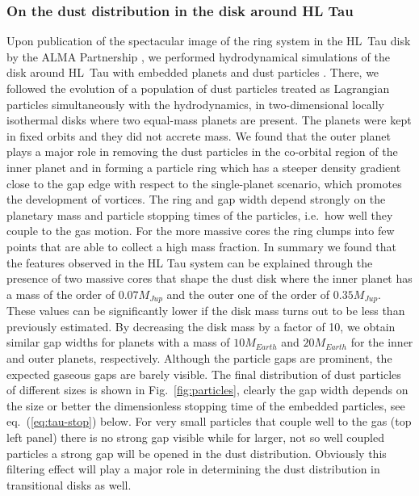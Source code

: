 \documentclass[10pt,fleqn,twoside]{article}
\begin{document}
\subsubsection{On the dust distribution in the disk around HL Tau}
%
Upon publication of the spectacular image of the ring system in the HL~Tau disk by the ALMA Partnership
\citep{2015ApJ...808L...3A}, we
performed hydrodynamical simulations of the disk around HL~Tau with embedded planets and dust particles \citep{2015A&A...584A.110P}.
There, we followed the evolution of a population of dust particles treated as Lagrangian particles simultaneously with
the hydrodynamics, 
in two-dimensional locally isothermal disks where two equal-mass planets are present. 
The planets were kept in fixed orbits and they did not accrete mass. 
We found that the outer planet plays a major role in removing the dust particles in the co-orbital region of the 
inner planet and in forming a particle ring which has a steeper density gradient 
close to the gap edge with respect to the single-planet scenario, which promotes the development of vortices. 
The ring and gap width depend strongly on the planetary mass and particle stopping times of the particles,
i.e.\ how well they couple to the gas motion.
For the more massive cores the ring clumps into few points that are able to collect a high mass fraction.
In summary we found that the features observed in the HL Tau system can be explained
through the presence of two massive cores that shape the dust disk where the inner planet
has a mass of the order of $0.07 M_{Jup}$ and the outer one of the order of $0.35 M_{Jup}$. 
These values can be significantly lower if the disk mass turns out to be less than previously estimated. 
By decreasing the disk mass by a factor of 10, we obtain similar gap widths for planets with
a mass of $10 M_{Earth}$ and $20 M_{Earth}$ for the inner and outer planets, respectively. 
Although the particle gaps are prominent, the expected gaseous gaps are barely visible.
The final distribution of dust particles of different sizes is shown in Fig.~\ref{fig:particles},
clearly the gap width depends on the size or better the dimensionless stopping time of the embedded particles,
see eq.~(\ref{eq:tau-stop}) below.
For very small particles that couple well to the gas (top left panel) there is no strong gap visible
while for larger, not so well coupled particles a strong gap will be opened in the dust distribution.
Obviously this filtering effect will play a major role in determining the dust distribution in transitional disks as well.
\end{document}
